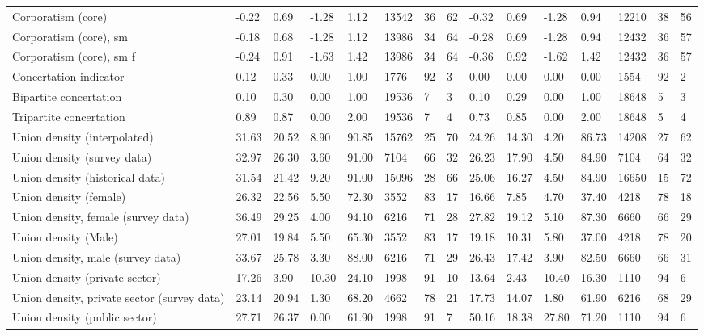 \begin{longtable}{lllllllllllllll}
Corporatism (core) & -0.22 & 0.69 & -1.28 & 1.12 & 13542 & 36 & 62 & -0.32 & 0.69 & -1.28 & 0.94 & 12210 & 38 & 56\\
\addlinespace
Corporatism (core), sm & -0.18 & 0.68 & -1.28 & 1.12 & 13986 & 34 & 64 & -0.28 & 0.69 & -1.28 & 0.94 & 12432 & 36 & 57\\
Corporatism (core), sm f & -0.24 & 0.91 & -1.63 & 1.42 & 13986 & 34 & 64 & -0.36 & 0.92 & -1.62 & 1.42 & 12432 & 36 & 57\\
Concertation indicator & 0.12 & 0.33 & 0.00 & 1.00 & 1776 & 92 & 3 & 0.00 & 0.00 & 0.00 & 0.00 & 1554 & 92 & 2\\
Bipartite concertation & 0.10 & 0.30 & 0.00 & 1.00 & 19536 & 7 & 3 & 0.10 & 0.29 & 0.00 & 1.00 & 18648 & 5 & 3\\
Tripartite concertation & 0.89 & 0.87 & 0.00 & 2.00 & 19536 & 7 & 4 & 0.73 & 0.85 & 0.00 & 2.00 & 18648 & 5 & 4\\
\addlinespace
Union density (interpolated) & 31.63 & 20.52 & 8.90 & 90.85 & 15762 & 25 & 70 & 24.26 & 14.30 & 4.20 & 86.73 & 14208 & 27 & 62\\
Union density (survey data) & 32.97 & 26.30 & 3.60 & 91.00 & 7104 & 66 & 32 & 26.23 & 17.90 & 4.50 & 84.90 & 7104 & 64 & 32\\
Union density (historical data) & 31.54 & 21.42 & 9.20 & 91.00 & 15096 & 28 & 66 & 25.06 & 16.27 & 4.50 & 84.90 & 16650 & 15 & 72\\
Union density (female) & 26.32 & 22.56 & 5.50 & 72.30 & 3552 & 83 & 17 & 16.66 & 7.85 & 4.70 & 37.40 & 4218 & 78 & 18\\
Union density, female (survey data) & 36.49 & 29.25 & 4.00 & 94.10 & 6216 & 71 & 28 & 27.82 & 19.12 & 5.10 & 87.30 & 6660 & 66 & 29\\
\addlinespace
Union density (Male) & 27.01 & 19.84 & 5.50 & 65.30 & 3552 & 83 & 17 & 19.18 & 10.31 & 5.80 & 37.00 & 4218 & 78 & 20\\
Union density, male (survey data) & 33.67 & 25.78 & 3.30 & 88.00 & 6216 & 71 & 29 & 26.43 & 17.42 & 3.90 & 82.50 & 6660 & 66 & 31\\
Union density (private sector) & 17.26 & 3.90 & 10.30 & 24.10 & 1998 & 91 & 10 & 13.64 & 2.43 & 10.40 & 16.30 & 1110 & 94 & 6\\
Union density, private sector (survey data) & 23.14 & 20.94 & 1.30 & 68.20 & 4662 & 78 & 21 & 17.73 & 14.07 & 1.80 & 61.90 & 6216 & 68 & 29\\
Union density (public sector) & 27.71 & 26.37 & 0.00 & 61.90 & 1998 & 91 & 7 & 50.16 & 18.38 & 27.80 & 71.20 & 1110 & 94 & 6\\

\end{longtable}
